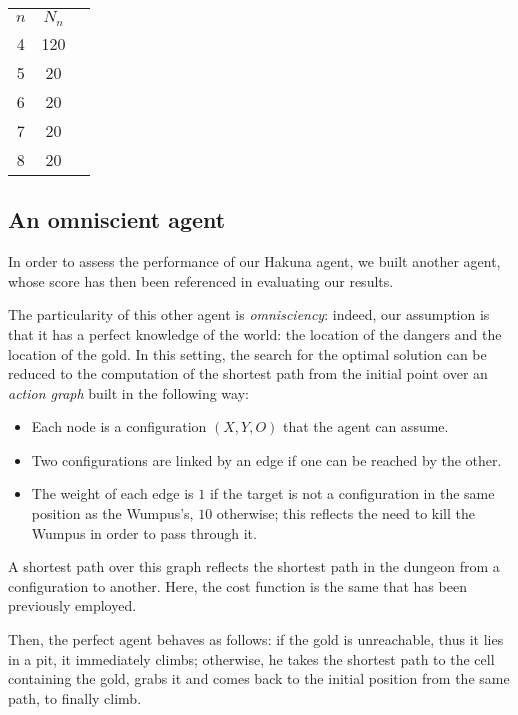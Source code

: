 \documentclass{llncs}
\begin{document}

\begin{tabular}{ccc}
$n$ & $N_n$ \\
4 & 120 \\
5 &  20 \\
6 &  20 \\
7 &  20 \\
8 &  20 \\
\end{tabular}


\subsection{An omniscient agent}

In order to assess the performance of our Hakuna agent, we built another agent, whose score has then been referenced in evaluating our results.

The particularity of this other agent is \emph{omnisciency}: indeed, our assumption is that it has a perfect knowledge of the world: the location of the dangers and the location of the gold.
In this setting, the search for the optimal solution can be reduced to the computation of the shortest path from the initial point over an \emph{action graph} built in the following way:
\begin{itemize}
	\item Each node is a configuration $(X,Y,O)$ that the agent can assume.
	\item Two configurations are linked by an edge if one can be reached by the other.
	\item The weight of each edge is $1$ if the target is not a configuration in the same position as the Wumpus's, $10$ otherwise; this reflects the need to kill the Wumpus in order to pass through it.
\end{itemize}
A shortest path over this graph reflects the shortest path in the dungeon from a configuration to another.
Here, the cost function is the same that has been previously employed.

Then, the perfect agent behaves as follows: if the gold is unreachable, thus it lies in a pit, it immediately climbs; otherwise, he takes the shortest path to the cell containing the gold, grabs it and comes back to the initial position from the same path, to finally climb.

%
%
%
%

\newpage

\appendix
\footnotesize

\begin{multicols}{2}

\end{multicols}


\end{document}
